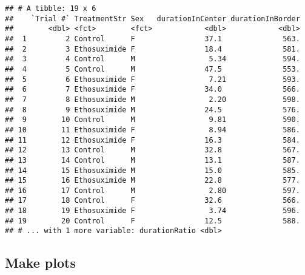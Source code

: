 \documentclass[]{article}
\newenvironment{Shaded}{\begin{snugshade}}{\end{snugshade}}
\newcommand{\KeywordTok}[1]{\textcolor[rgb]{0.13,0.29,0.53}{\textbf{#1}}}
\newcommand{\DataTypeTok}[1]{\textcolor[rgb]{0.13,0.29,0.53}{#1}}
\newcommand{\StringTok}[1]{\textcolor[rgb]{0.31,0.60,0.02}{#1}}
\newcommand{\CommentTok}[1]{\textcolor[rgb]{0.56,0.35,0.01}{\textit{#1}}}
\newcommand{\OperatorTok}[1]{\textcolor[rgb]{0.81,0.36,0.00}{\textbf{#1}}}
\newcommand{\NormalTok}[1]{#1}
\begin{document}
\begin{Shaded}
\end{Shaded}

\begin{verbatim}
## # A tibble: 19 x 6
##    `Trial #` TreatmentStr Sex   durationInCenter durationInBorder
##        <dbl> <fct>        <fct>            <dbl>            <dbl>
##  1         2 Control      F                37.1              563.
##  2         3 Ethosuximide F                18.4              581.
##  3         4 Control      M                 5.34             594.
##  4         5 Control      M                47.5              553.
##  5         6 Ethosuximide F                 7.21             593.
##  6         7 Ethosuximide F                34.0              566.
##  7         8 Ethosuximide M                 2.20             598.
##  8         9 Ethosuximide M                24.5              576.
##  9        10 Control      M                 9.81             590.
## 10        11 Ethosuximide F                 8.94             586.
## 11        12 Ethosuximide F                16.3              584.
## 12        13 Control      M                32.8              567.
## 13        14 Control      M                13.1              587.
## 14        15 Ethosuximide M                15.0              585.
## 15        16 Ethosuximide M                22.8              577.
## 16        17 Control      M                 2.80             597.
## 17        18 Control      F                32.6              566.
## 18        19 Ethosuximide F                 3.74             596.
## 19        20 Control      F                12.5              588.
## # ... with 1 more variable: durationRatio <dbl>
\end{verbatim}

\subsection{Make plots}\label{make-plots}
\end{document}
